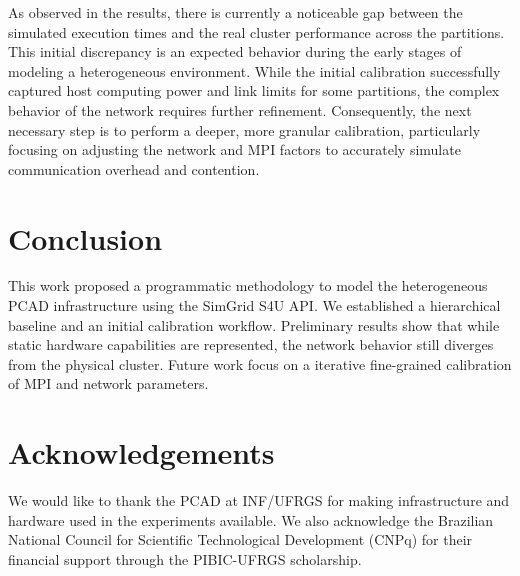 \documentclass[12pt]{article}
\begin{document}
As observed in the results, there is currently a noticeable gap
between the simulated execution times and the real cluster performance
across the partitions. This initial discrepancy is an expected
behavior during the early stages of modeling a heterogeneous
environment. While the initial calibration successfully captured host
computing power and link limits for some partitions, the complex
behavior of the network requires further refinement. Consequently, the
next necessary step is to perform a deeper, more granular calibration,
particularly focusing on adjusting the network and MPI factors to
accurately simulate communication overhead and contention.

\section{Conclusion}
\label{sec:org24b5d0b}
\label{org2c28c6e}

This work proposed a programmatic methodology to model the
heterogeneous PCAD infrastructure using the SimGrid S4U API. We
established a hierarchical baseline and an initial calibration
workflow. Preliminary results show that while static hardware
capabilities are represented, the network behavior still diverges from
the physical cluster. Future work focus on a iterative fine-grained
calibration of MPI and network parameters.

\section*{Acknowledgements}
We would like to thank the PCAD at INF/UFRGS for making infrastructure
and hardware used in the experiments available. We also acknowledge
the Brazilian National Council for Scientific Technological
Development (CNPq) for their financial support through the PIBIC-UFRGS
scholarship.



\end{document}
